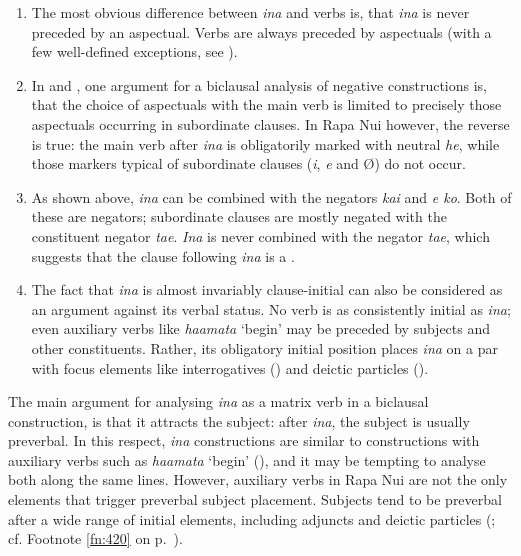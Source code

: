 \begin{enumerate}
\item 
The most obvious difference between \textit{{\ꞌ}ina} and verbs is, that \textit{{\ꞌ}ina} is never preceded by an aspectual. Verbs are always preceded by aspectuals (with a few well-defined exceptions, see ).

\item 
In  and , one argument for a biclausal analysis of negative constructions is, that the choice of aspectuals with the main verb is limited to precisely those aspectuals occurring in subordinate clauses. In Rapa Nui however, the reverse is true: the main verb after \textit{{\ꞌ}ina} is obligatorily marked with neutral \textit{he}, while those markers typical of subordinate clauses (\textit{i}, \textit{e} and Ø) do not occur. 

\item 
As shown above, \textit{{\ꞌ}ina} can be combined with the negators \textit{kai} and \textit{e ko}. Both of these are  negators; subordinate clauses are mostly negated with the constituent negator \textit{ta{\ꞌ}e}. \textit{{\ꞌ}Ina} is never combined with the negator \textit{ta{\ꞌ}e}, which suggests that the clause following \textit{{\ꞌ}ina} is a .

\item 
The fact that \textit{{\ꞌ}ina} is almost invariably clause-initial can also be considered as an argument against its verbal status. No verb is as consistently initial as \textit{{\ꞌ}ina}; even auxiliary verbs like \textit{ha{\ꞌ}amata} ‘begin’ may be preceded by subjects and other constituents. Rather, its obligatory initial position places \textit{{\ꞌ}ina} on a par with focus elements like interrogatives () and deictic particles ().

\end{enumerate}

The main argument for analysing \textit{{\ꞌ}ina} as a matrix verb in a biclausal construction, is that it attracts the subject: after \textit{{\ꞌ}ina}, the subject is usually preverbal. In this respect, \textit{{\ꞌ}ina} constructions are similar to constructions with auxiliary verbs such as \textit{ha{\ꞌ}amata} ‘begin’ (), and it may be tempting to analyse both along the same lines. However, auxiliary verbs in Rapa Nui are not the only elements that trigger preverbal subject placement. Subjects tend to be preverbal after a wide range of initial elements, including adjuncts and deictic particles (; cf. Footnote \ref{fn:420} on p.~\pageref{fn:420}). 

